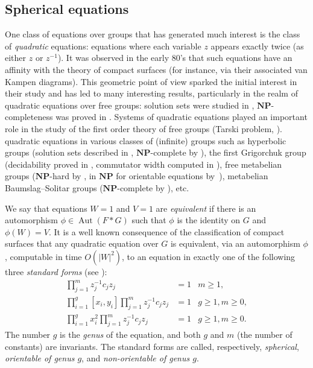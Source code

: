 \documentclass{jgcc}
\def\NP{{\mathbf{NP}}}
\DeclareMathOperator{\Aut}{{Aut}}
\begin{document}
\subsection{Spherical equations}

One class of equations over groups that has generated much interest 
is the class of \emph{quadratic} equations: equations where each 
variable $z$ appears exactly twice (as either $z$ or $z^{-1}$). 
It was observed in the early 80's \cite{Culler:1981,Schupp:1980} that such equations have an affinity with the theory of compact surfaces (for instance, via their associated van Kampen diagrams).
This geometric point of view sparked the initial interest in their study and
 has led to many interesting results,
particularly in the realm of quadratic equations over free groups: 
solution sets were studied  in \cite{Grigorchuk-Kurchanov:1992}, 
$\NP$-completeness was proved in 
\cite{Diekert-Robson:1999,Kharlampovich-Lysenok-Myasnikov-Touikan:2010}.
Systems of quadratic equations
played an important role in the study of the first order theory of free groups 
(Tarski problem, \cite{Kharlampovich_Myasnikov:1998(1)}).
quadratic equations in various classes of (infinite) groups
such as hyperbolic groups 
(solution sets described in \cite{Grigorchuk-Lysenok:1992},
$\NP$-complete by \cite{Kharlampovich-Taam:2017}),
the first Grigorchuk group
(decidability proved in \cite{Lysenok-Miasnikov-Ushakov:2016},
commutator width computed in \cite{Bartholdi-Groth-Lysenok:2022}),
free metabelian groups
($\NP$-hard by \cite{Lysenok-Ushakov:2015},
in $\NP$ for orientable equations  
by~\cite{Lysenok-Ushakov:2021}),
metabelian Baumslag--Solitar groups
($\NP$-complete by \cite{Mandel-Ushakov:2023}), etc. 


We say that equations $W = 1$ and $V=1$ are \emph{equivalent} 
if there is an automorphism $\phi\in \Aut(F\ast G)$ such that 
$\phi$ is the identity on $G$ and $\phi(W) = V$. It is a well 
known consequence of the classification of compact surfaces 
that any quadratic equation over $G$ is equivalent, via an 
automorphism $\phi$, computable in time $O(|W|^2)$, to an equation 
in exactly one of the following three \emph{standard forms} (see 
\cite{Comerford_Edmunds:1981,Grigorchuk-Kurchanov:1992}):
\begin{align}
\prod_{j=1}^m z_j^{-1} c_j z_j&=1 &m\ge 1,\label{eq:spherical}\\
\prod_{i=1}^g[x_i,y_i]\prod_{j=1}^m z_j^{-1} c_j z_j&=1 &g\geq 1, m\geq 0, \label{eq:orientable}\\
\prod_{i = 1}^g x_i^2\prod_{j=1}^m z_j^{-1} c_j z_j&=1 &g \geq 1, m\geq 0.\label{eq:nonorientable}
\end{align}
The number $g$ is the \emph{genus} of the equation, and both $g$ and $m$ 
(the number of constants) are invariants. 
The standard forms are called, respectively, 
\emph{spherical}, \emph{orientable of genus $g$}, and 
\emph{non-orientable of genus $g$}.
\end{document}
